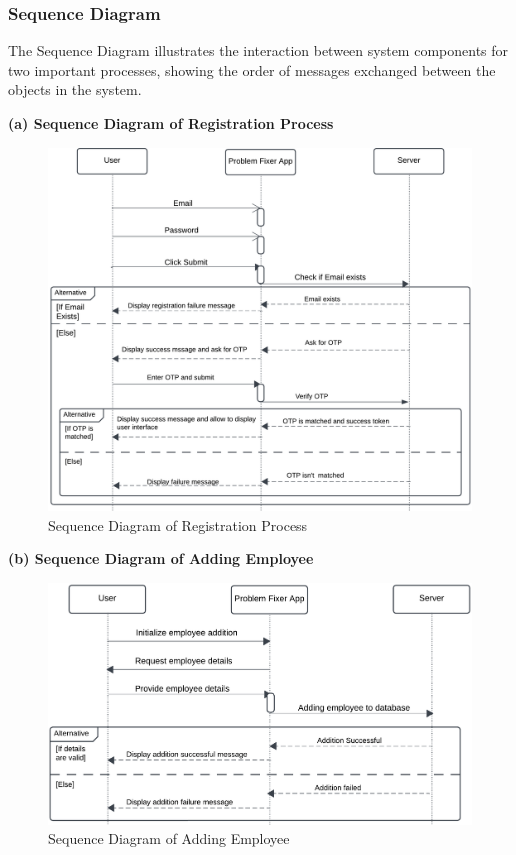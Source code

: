 \documentclass[a4paper,12pt]{article}
\begin{document}
\subsubsection{Sequence Diagram}
The Sequence Diagram illustrates the interaction between system components for two important processes, showing the order of messages exchanged between the objects in the system.

\noindent\textbf{(a) Sequence Diagram of Registration Process}
\begin{figure}[H]
    \centering
    \includegraphics[width=1\linewidth]{photos/Registration-sequence-diagram.png}

    \caption{Sequence Diagram of Registration Process}
    \label{fig:enter-label}
\end{figure}
\noindent\textbf{(b) Sequence Diagram of Adding Employee}
\begin{figure}[H]
    \centering
    \includegraphics[width=1\linewidth]{photos/employee-sequence.png}

    \caption{Sequence Diagram of Adding Employee}
    \label{fig:enter-label}
\end{figure}
\end{document}
